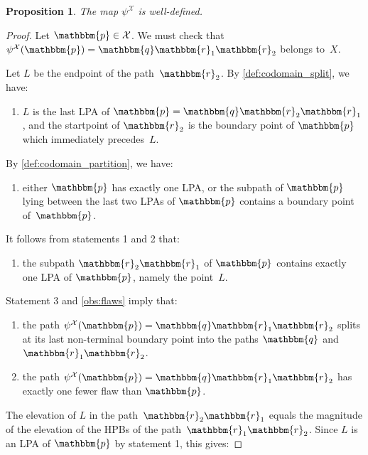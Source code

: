 \documentclass[11pt]{article}
\newtheorem{prop}[thm]{Proposition}
\theoremstyle{definition} %
\numberwithin{equation}{section}
\begin{document}
\begin{prop}
\label{rem:codomain_psi_X}
The map $\psi^\mathcal{X}$ is well-defined.
\end{prop}
\begin{proof}
    Let $\mathbbm{p} \in \mathcal{X}$.
    We must check that 
    $\psi^\mathcal X(\mathbbm{p}) = \mathbbm{q} \mathbbm{r}_1 \mathbbm{r}_2$ belongs to~$X$.

    Let $L$ be the endpoint of the path~$\mathbbm{r}_2$.
    By \cref{def:codomain_split}, we have:

    \begin{enumerate}
    \item[1.]
    $L$ is the last LPA of $\mathbbm{p}= \mathbbm{q} \mathbbm{r}_2 \mathbbm{r}_1$, and the startpoint of $\mathbbm{r}_2$ is the boundary point of $\mathbbm{p}$ which immediately precedes~$L$.
    \end{enumerate}
    
    By \cref{def:codomain_partition},  we have:

    \begin{enumerate}
    \item[2.]
    either $\mathbbm{p}$ has exactly one LPA,
    or the subpath of $\mathbbm{p}$ lying between the last two LPAs of $\mathbbm{p}$ contains a boundary point of~$\mathbbm{p}$.
    \end{enumerate}
    
    It follows from statements 1 and 2 that:

    \begin{enumerate}
    \item[3.]
    the subpath $\mathbbm{r}_2 \mathbbm{r}_1$ of $\mathbbm{p}$ contains exactly one LPA of $\mathbbm{p}$, namely the point~$L$.
    \end{enumerate}
    
    Statement 3 and \cref{obs:flaws} imply that:

    \begin{enumerate}
    \item[4.]
    the path $\psi^{\mathcal X}(\mathbbm{p}) = \mathbbm{q} \mathbbm{r}_1 \mathbbm{r}_2$ splits at its last non-terminal boundary point into the paths $\mathbbm{q}$ and~$\mathbbm{r}_1 \mathbbm{r}_2$.
    \item[5.]
    the path $\psi^\mathcal X(\mathbbm{p})= \mathbbm{q} \mathbbm{r}_1 \mathbbm{r}_2$ has exactly one fewer flaw than $\mathbbm{p}$.
    \end{enumerate}
    The elevation of $L$ in the path~$\mathbbm{r}_2 \mathbbm{r}_1$ equals the 
    magnitude of the elevation of the HPBs of the path~$\mathbbm{r}_1 \mathbbm{r}_2$. Since $L$ is an LPA of $\mathbbm{p}$ by statement 1, this gives:


\end{proof}
\end{document}
